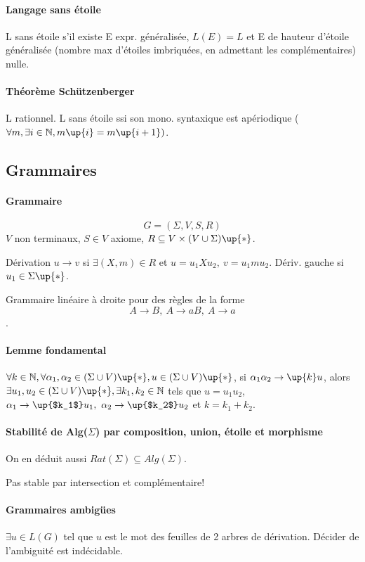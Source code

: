 \documentclass[french]{article}
\begin{document}
\paragraph{Langage sans étoile} 
L sans étoile s'il existe E expr. généralisée, $L(E) = L$ et E de hauteur d'étoile généralisée (nombre max d'étoiles imbriquées, en admettant les complémentaires) nulle.

\paragraph{Théorème Schützenberger}
L rationnel. L sans étoile ssi son mono. syntaxique est apériodique ($\forall m, \exists i\in\mathbb{N}, m\up{i} = m\up{i+1})$.

\subsection{Grammaires}
\paragraph{Grammaire}
$$G = (\Sigma, V, S, R)$$
$V$ non terminaux, $S\in V$ axiome, $R\subseteq V\times(V\cup\Sigma)\up{*}$.

Dérivation $u\rightarrow v$ si $\exists (X,m)\in R$ et $u=u_1Xu_2,\ v = u_1mu_2$. Dériv. gauche si $u_1\in\Sigma\up{*}$.

Grammaire linéaire à droite pour des règles de la forme $$A\rightarrow B,\ A\rightarrow aB,\ A\rightarrow a$$.

\paragraph{Lemme fondamental}
$\forall k\in\mathbb{N}, \forall \alpha_1,\alpha_2 \in(\Sigma\cup V)\up{*}, u\in (\Sigma\cup V)\up{*}$, si $\alpha_1\alpha_2\rightarrow\up{k}u$, alors $\exists u_1,u_2\in(\Sigma\cup V)\up{*}, \exists k_1,k_2\in\mathbb{N}$ tels que $u = u_1 u_2$, $\alpha_1\rightarrow\up{$k_1$} u_1,\ \alpha_2 \rightarrow \up{$k_2$} u_2$ et $k = k_1 + k_2$.

\paragraph{Stabilité de Alg($\Sigma$) par composition, union, étoile et morphisme}  
On en déduit aussi $Rat(\Sigma) \subseteq Alg(\Sigma)$.

Pas stable par intersection et complémentaire!

\paragraph{Grammaires ambigües}
$\exists u\in L(G)$ tel que $u$ est le mot des feuilles de 2 arbres de dérivation. Décider de l'ambiguité est indécidable.
\end{document}
